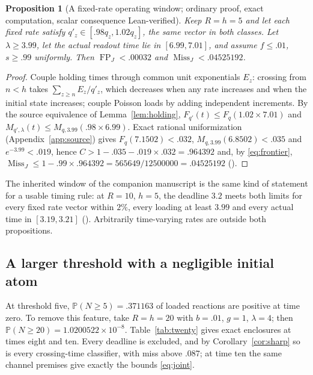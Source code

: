 \documentclass[11pt,a4paper]{article}
\theoremstyle{plain}
\newtheorem{proposition}[theorem]{Proposition}
\theoremstyle{definition}
\theoremstyle{remark}
\newcommand{\Prob}{\mathbb P}
\newcommand{\FP}{\operatorname{FP}}
\newcommand{\Miss}{\operatorname{Miss}}
\begin{document}
\begin{proposition}[A fixed-rate operating window; ordinary proof, exact computation, scalar consequence Lean-verified]\label{prop:robust}
Keep $R=h=5$ and let each fixed rate satisfy $q'_z\in[.98q_z,1.02q_z]$, the same vector in both classes. Let $\lambda\ge3.99$, let the actual readout time lie in $[6.99,7.01]$, and assume $f\le.01$, $s\ge.99$ uniformly. Then $\FP_J<.00032$ and $\Miss_J<.04525192$.
\end{proposition}
\begin{proof}
Couple holding times through common unit exponentials $E_z$: crossing from $n<h$ takes $\sum_{z\ge n}E_z/q'_z$, which decreases when any rate increases and when the initial state increases; couple Poisson loads by adding independent increments. By the source equivalence of Lemma~\ref{lem:holding}, $F_{q'}(t)\le F_q(1.02\times7.01)$ and $M_{q',\lambda}(t)\le M_{q,3.99}(.98\times6.99)$. Exact rational uniformization (Appendix~\ref{app:source}) gives $F_q(7.1502)<.032$, $M_{q,3.99}(6.8502)<.035$ and $e^{-3.99}<.019$, hence $C>1-.035-.019\times.032=.964392$ and, by \eqref{eq:frontier}, $\Miss_J\le1-.99\times.964392=565649/12500000=.04525192$ ().
\end{proof}
The inherited window of the companion manuscript is the same kind of statement for a usable timing rule: at $R=10$, $h=5$, the deadline $3.2$ meets both limits for every fixed rate vector within $2\%$, every loading at least $3.99$ and every actual time in $[3.19,3.21]$ (). Arbitrarily time-varying rates are outside both propositions.

\subsection{A larger threshold with a negligible initial atom}
At threshold five, $\Prob(N\ge5)=.371163$ of loaded reactions are positive at time zero. To remove this feature, take $R=h=20$ with $b=.01$, $g=1$, $\lambda=4$; then $\Prob(N\ge20)=1.0200522\times10^{-8}$. Table~\ref{tab:twenty} gives exact enclosures at times eight and ten. Every deadline is excluded, and by Corollary~\ref{cor:sharp} so is every crossing-time classifier, with miss above $.087$; at time ten the same channel premises give exactly the bounds \eqref{eq:joint}.
\end{document}
